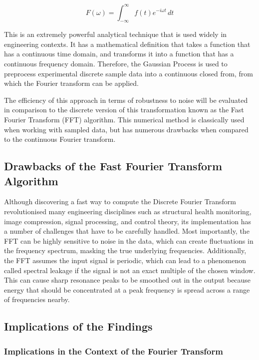 \documentclass[12pt]{article}
\begin{document}
    \begin{equation}
        F(\omega) = \int_{-\infty}^{\infty} f(t) e^{-i \omega t} \, dt\label{eq:ft}
    \end{equation}


    This is an extremely powerful analytical technique that is used widely in engineering contexts.
    It has a mathematical definition that takes a function that has a continuous time domain, and transforms it into a function that has a continuous frequency domain.
    Therefore, the Gaussian Process is used to preprocess experimental discrete sample data into a continuous closed from, from which the Fourier transform can be applied.

    The efficiency of this approach in terms of robustness to noise will be evaluated in comparison to the discrete version of this transformation known as the Fast Fourier Transform (FFT) algorithm.
    This numerical method is classically used when working with sampled data, but has numerous drawbacks when compared to the continuous Fourier transform.

    \subsection{Drawbacks of the Fast Fourier Transform Algorithm}
    Although discovering a fast way to compute the Discrete Fourier Transform revolutionised many engineering disciplines such as structural health monitoring, image compression, signal processing, and control theory\cite{Byjus2023}, its implementation has a number of challenges that have to be carefully handled.
    Most importantly, the FFT can be highly sensitive to noise in the data, which can create fluctuations in the frequency spectrum, masking the true underlying frequencies\cite{MathStackExchange2023}.
    Additionally, the FFT assumes the input signal is periodic, which can lead to a phenomenon called spectral leakage if the signal is not an exact multiple of the chosen window\cite{MathStackExchange2023}.
    This can cause sharp resonance peaks to be smoothed out in the output because energy that should be concentrated at a peak frequency is spread across a range of frequencies nearby.


    \subsection{Implications of the Findings}

    \subsubsection{Implications in the Context of the Fourier Transform}
\end{document}
